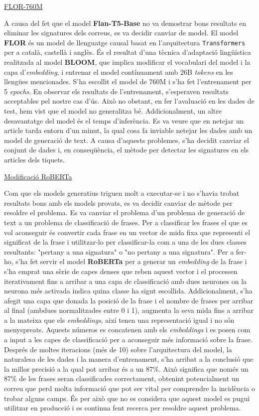 \underline{FLOR-760M}

A causa del fet que el model \textbf{Flan-T5-Base} no va demostrar bons resultats en eliminar les signatures dels correus, es va decidir canviar de model. El model \textbf{FLOR} és un model de llenguatge causal basat en l'arquitectura \texttt{Transformers} per a català, castellà i anglès. És el resultat d'una tècnica d'adaptació lingüística realitzada al model \textbf{BLOOM}, que implica modificar el vocabulari del model i la capa d'\textit{embedding}, i entrenar el model contínuament amb 26B \textit{tokens} en les llengües mencionades. S'ha escollit el model de 760M i s'ha fet l'entrenament per 5 \textit{epochs}.
En observar els resultats de l'entrenament, s'esperaven resultats acceptables pel nostre cas d'ús. Això no obstant, en fer l'avaluació en les dades de test, hem vist que el model no generalitza bé. Addicionalment, un altre desavantatge del model és el temps d'inferència. Es va veure que en netejar un article tarda entorn d'un minut, la qual cosa fa inviable netejar les dades amb un model de generació de text.
A causa d'aquests problemes, s'ha decidit canviar el conjunt de dades i, en conseqüència, el mètode per detectar les signatures en els articles dels tiquets.

\underline{Modificació RoBERTa}

Com que els models generatius triguen molt a executar-se i no s'havia trobat resultats bons amb els models provats, es va decidir canviar de mètode per resoldre el problema. Es va canviar el problema d'un problema de generació de text a un problema de classificació de frases. Per a classificar les frases el que es vol aconseguir és convertir cada frase en un vector de mida fixa que representi el significat de la frase i utilitzar-lo per classificar-la com a una de les dues classes resultants: "pertany a una signatura" o "no pertany a una signatura". Per a fer-ho, s'ha fet servir el model \textbf{RoBERTa} per a generar un \textit{embedding} de la frase i s'ha emprat una sèrie de capes denses que reben aquest vector i el processen iterativament fins a arribar a una capa de classificació amb dues neurones on la neurona més activada indica quina classe ha sigut escollida.
Addicionalment, s'ha afegit una capa que donada la posició de la frase i el nombre de frases per arribar al final (ambdues normalitzades entre 0 i 1), augmenta la seva mida fins a arribar a la mateixa que els \textit{embeddings}, així tenen una representació igual i no són menyspreats. Aquests números es concatenen amb els \textit{embeddings} i es posen com a input a les capes de classificació per a aconseguir més informació sobre la frase.
Després de moltes iteracions (més de 10) sobre l'arquitectura del model, la naturalesa de les dades i la manera d'entrenament, s'ha arribat a la conclusió que la millor precisió a la qual pot arribar és a un 87\%. Això significa que només un 87\% de les frases seran classificades correctament, obtenint potencialment un correu que perd molta informació que pot ser vital per comprendre la incidència o trobar alguns camps. És per això que no es considera que aquest model es pugui utilitzar en producció i es continua fent recerca per resoldre aquest problema.

